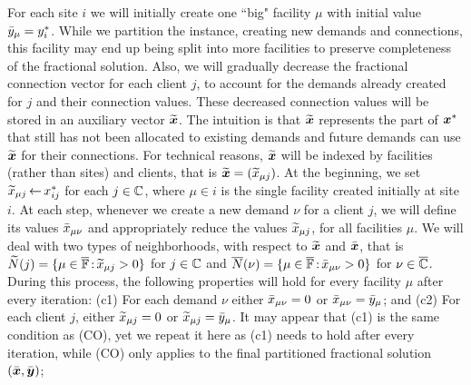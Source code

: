 \documentclass[11pt]{article}
\begin{document}
For each site $i$ we will initially create one ``big" facility $\mu$
with initial value ${\bar y}_\mu = y^\ast_i$.  While we partition the
instance, creating new demands and connections, this facility may end
up being split into more facilities to preserve completeness of the
fractional solution. Also, we will gradually decrease the fractional
connection vector for each client $j$, to account for the demands
already created for $j$ and their connection values.  These decreased
connection values will be stored in an auxiliary vector
$\widetilde{\boldsymbol{x}}$. The intuition is that $\widetilde{\boldsymbol{x}}$ represents the part of
$\boldsymbol{x}^\ast$ that still has not been allocated to existing demands and
future demands can use $\widetilde{\boldsymbol{x}}$ for their connections. For
technical reasons, $\widetilde{\boldsymbol{x}}$ will be indexed by facilities (rather
than sites) and clients, that is $\widetilde{\boldsymbol{x}} = ({\widetilde x}_{\mu j})$.  At
the beginning, we set ${\widetilde x}_{\mu j}{\,\leftarrow\,} x_{ij}^\ast$ for each
$j\in\mathbb{C}$, where $\mu\in i$ is the single facility created
initially at site $i$.  At each step, whenever we create a new demand
$\nu$ for a client $j$, we will define its values ${\bar x}_{\mu\nu}$ and
appropriately reduce the values ${\widetilde x}_{\mu j}$, for all facilities
$\mu$. We will deal with two types of neighborhoods, with respect to
$\widetilde{\boldsymbol{x}}$ and $\bar{\boldsymbol{x}}$, that is ${\widetilde N}(j)=\{\mu\in\overline{\mathbb{F}}
{\,:\,}{\widetilde x}_{\mu j} > 0\}$ for $j\in\mathbb{C}$ and
${\overline{N}}(\nu)=\{\mu\in\overline{\mathbb{F}} {\,:\,} {\bar x}_{\mu\nu} >0\}$ for
$\nu\in\overline{\mathbb{C}}$.  During this process, the following properties
will hold for every facility $\mu$ after every iteration: (c1) For
each demand $\nu$ either ${\bar x}_{\mu\nu}=0$ or
${\bar x}_{\mu\nu}={\bar y}_{\mu}$; and (c2) For each client $j$, either
${\widetilde x}_{\mu j}=0$ or ${\widetilde x}_{\mu j}={\bar y}_{\mu}$. It may appear
that (c1) is the same condition as (CO), yet we repeat it here as (c1)
needs to hold after every iteration, while (CO) only applies to the
final partitioned fractional solution $(\bar{\boldsymbol{x}}, \bar{\boldsymbol{y}})$;
\end{document}
